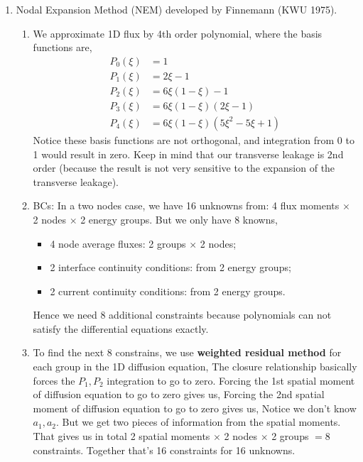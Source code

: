 \documentclass{school-22.211-notes}
\begin{document}
\clearpage
{}
\begin{enumerate}
\item Nodal Expansion Method (NEM) developed by Finnemann (KWU 1975). 
  \begin{enumerate}
  \item We approximate 1D flux by 4th order polynomial, 
    where the basis functions are, 
    \begin{align}
      P_0(\xi) &= 1 \\
      P_1(\xi) &= 2 \xi - 1\\
      P_2(\xi) &= 6 \xi (1-\xi) - 1 \\
      P_3(\xi) &= 6 \xi (1-\xi)(2\xi-1) \\
      P_4(\xi) &= 6 \xi (1-\xi)(5\xi^2 -5\xi +1)
    \end{align}
    Notice these basis functions are not orthogonal, and integration from 0 to 1 would result in zero. Keep in mind that our transverse leakage is 2nd order (because the result is not very sensitive to the expansion of the transverse leakage). 

  \item BCs: In a two nodes case, we have 16 unknowns from: 4 flux moments $\times$ 2 nodes $\times$ 2 energy groups. But we only have 8 knowns, 
    \begin{itemize}
      \item 4 node average fluxes: 2 groups $\times$ 2 nodes;
      \item 2 interface continuity conditions: from 2 energy groups;
      \item 2 current continuity conditions: from 2 energy groups. 
    \end{itemize}
    Hence we need 8 additional constraints because polynomials can not satisfy the differential equations exactly. 

  \item To find the next 8 constrains, we use \textbf{weighted residual method} for each group in the 1D diffusion equation, 
    The closure relationship basically forces the $P_1, P_2$ integration to go to zero. Forcing the 1st spatial moment of diffusion equation to go to zero gives us, 
    Forcing the 2nd spatial moment of diffusion equation to go to zero gives us, 
    Notice we don't know $a_1, a_2$. But we get two pieces of information from the spatial moments. That gives us in total 2 spatial moments $\times$ 2 nodes $\times$ 2 groups $= 8$ constraints. Together that's 16 constraints for 16 unknowns. 


\end{enumerate}
\end{enumerate}
\end{document}
